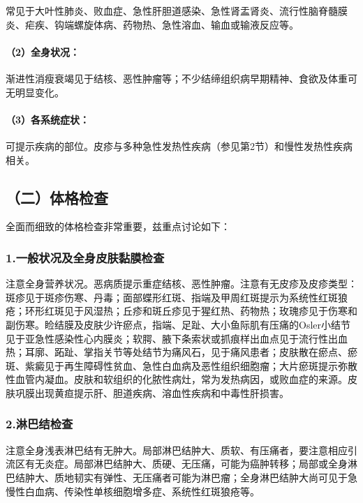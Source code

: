 常见于大叶性肺炎、败血症、急性肝胆道感染、急性肾盂肾炎、流行性脑脊髓膜炎、疟疾、钩端螺旋体病、药物热、急性溶血、输血或输液反应等。

\paragraph{（2）全身状况：}

渐进性消瘦衰竭见于结核、恶性肿瘤等；不少结缔组织病早期精神、食欲及体重可无明显变化。

\paragraph{（3）各系统症状：}

可提示疾病的部位。皮疹与多种急性发热性疾病（参见第2节）和慢性发热性疾病相关。

\subsection{（二）体格检查}

全面而细致的体格检查非常重要，兹重点讨论如下：

\subsubsection{1.一般状况及全身皮肤黏膜检查}

注意全身营养状况。恶病质提示重症结核、恶性肿瘤。注意有无皮疹及皮疹类型：斑疹见于斑疹伤寒、丹毒；面部蝶形红斑、指端及甲周红斑提示为系统性红斑狼疮；环形红斑见于风湿热；丘疹和斑丘疹见于猩红热、药物热；玫瑰疹见于伤寒和副伤寒。睑结膜及皮肤少许瘀点，指端、足趾、大小鱼际肌有压痛的Osler小结节见于亚急性感染性心内膜炎；软腭、腋下条索状或抓痕样出血点见于流行性出血热；耳廓、跖趾、掌指关节等处结节为痛风石，见于痛风患者；皮肤散在瘀点、瘀斑、紫癜见于再生障碍性贫血、急性白血病及恶性组织细胞瘤；大片瘀斑提示弥散性血管内凝血。皮肤和软组织的化脓性病灶，常为发热病因，或败血症的来源。皮肤巩膜出现黄疸提示肝、胆道疾病、溶血性疾病和中毒性肝损害。

\subsubsection{2.淋巴结检查}

注意全身浅表淋巴结有无肿大。局部淋巴结肿大、质软、有压痛者，要注意相应引流区有无炎症。局部淋巴结肿大、质硬、无压痛，可能为癌肿转移；局部或全身淋巴结肿大、质地韧实有弹性、无压痛者可能为淋巴瘤；全身淋巴结肿大尚可见于急慢性白血病、传染性单核细胞增多症、系统性红斑狼疮等。

